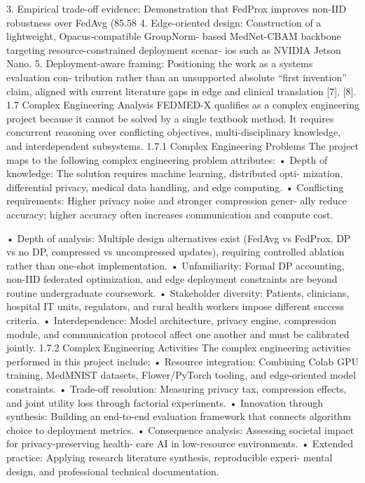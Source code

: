 3. Empirical trade-off evidence: Demonstration that FedProx improves non-IID robustness over FedAvg (85.58%
4. Edge-oriented design: Construction of a lightweight, Opacus-compatible GroupNorm- based MedNet-CBAM backbone targeting resource-constrained deployment scenar- ios such as NVIDIA Jetson Nano.
5. Deployment-aware framing: Positioning the work as a systems evaluation con- tribution rather than an unsupported absolute “first invention” claim, aligned with current literature gaps in edge and clinical translation [7], [8].
1.7
Complex Engineering Analysis
FEDMED-X qualifies as a complex engineering project because it cannot be solved by a single textbook method. It requires concurrent reasoning over conflicting objectives, multi-disciplinary knowledge, and interdependent subsystems.
1.7.1
Complex Engineering Problems
The project maps to the following complex engineering problem attributes:
• Depth of knowledge: The solution requires machine learning, distributed opti- mization, differential privacy, medical data handling, and edge computing.
• Conflicting requirements: Higher privacy noise and stronger compression gener- ally reduce accuracy; higher accuracy often increases communication and compute cost.

• Depth of analysis: Multiple design alternatives exist (FedAvg vs FedProx, DP vs no DP, compressed vs uncompressed updates), requiring controlled ablation rather than one-shot implementation.
• Unfamiliarity: Formal DP accounting, non-IID federated optimization, and edge deployment constraints are beyond routine undergraduate coursework.
• Stakeholder diversity: Patients, clinicians, hospital IT units, regulators, and rural health workers impose different success criteria.
• Interdependence: Model architecture, privacy engine, compression module, and communication protocol affect one another and must be calibrated jointly.
1.7.2
Complex Engineering Activities
The complex engineering activities performed in this project include:
• Resource integration: Combining Colab GPU training, MedMNIST datasets,
Flower/PyTorch tooling, and edge-oriented model constraints.
• Trade-off resolution: Measuring privacy tax, compression effects, and joint utility loss through factorial experiments.
• Innovation through synthesis: Building an end-to-end evaluation framework that connects algorithm choice to deployment metrics.
• Consequence analysis: Assessing societal impact for privacy-preserving health- care AI in low-resource environments.
• Extended practice: Applying research literature synthesis, reproducible experi- mental design, and professional technical documentation.


